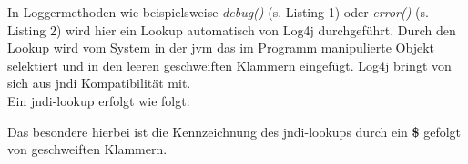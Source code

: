 In Loggermethoden wie beispielsweise \textit{debug()} (s. Listing 1) oder \textit{error()} (s. Listing 2) wird hier ein Lookup automatisch von Log4j durchgeführt. Durch den Lookup wird vom System in der \gls{jvm} das im Programm
manipulierte Objekt selektiert und in den leeren geschweiften Klammern eingefügt. Log4j bringt von sich aus \gls{jndi} Kompatibilität mit.\\

Ein \gls{jndi}-lookup erfolgt wie folgt:

\bigskip

Das besondere hierbei ist die Kennzeichnung des \gls{jndi}-lookups durch ein \textbf{\$} gefolgt von geschweiften Klammern.